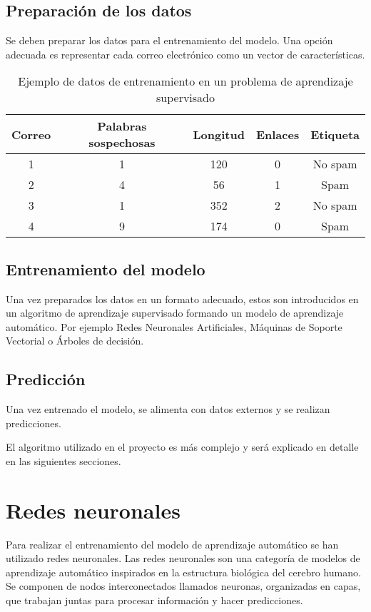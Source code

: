 \subsection{Preparación de los datos}
Se deben preparar los datos para el entrenamiento del modelo. 
Una opción adecuada es representar cada correo electrónico como un vector de características.

\begin{table}[ht]
\centering
\begin{tabular}{|c|c|c|c|c|}
\hline
\textbf{Correo} & \textbf{Palabras sospechosas} & \textbf{Longitud} & \textbf{Enlaces} & \textbf{Etiqueta} \\ \hline
1 & 1 & 120 & 0 & No spam \\
2 & 4 & 56 & 1 & Spam \\
3 & 1 & 352 & 2 & No spam \\
4 & 9 & 174 & 0 & Spam \\
\hline
\end{tabular}
\caption{Ejemplo de datos de entrenamiento en un problema de aprendizaje supervisado}
\end{table}

\subsection{Entrenamiento del modelo}
Una vez preparados los datos en un formato adecuado, estos son introducidos en un algoritmo de aprendizaje supervisado formando un modelo de aprendizaje automático. Por ejemplo Redes Neuronales Artificiales, Máquinas de Soporte Vectorial o Árboles de decisión.

\subsection{Predicción}
Una vez entrenado el modelo, se alimenta con datos externos y se realizan predicciones.

El algoritmo utilizado en el proyecto es más complejo y será explicado en detalle en las siguientes secciones.

\newpage

\section{Redes neuronales}
Para realizar el entrenamiento del modelo de aprendizaje automático se han utilizado redes neuronales. 
Las redes neuronales son una categoría de modelos de aprendizaje automático inspirados en la estructura biológica del cerebro humano. Se componen de nodos interconectados llamados neuronas, organizadas en capas, que trabajan juntas para procesar información y hacer predicciones.

